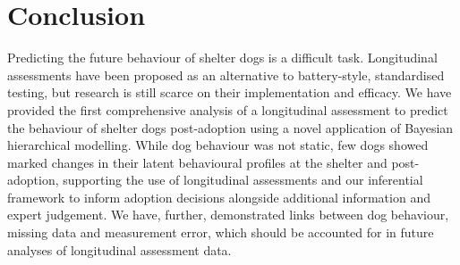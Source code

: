 \documentclass[12pt]{article}
\begin{document}
\section{Conclusion}
Predicting the future behaviour of shelter dogs is a difficult task. Longitudinal assessments have been proposed as an alternative to battery-style, standardised testing, but research is still scarce on their implementation and efficacy. We have provided the first comprehensive analysis of a longitudinal assessment to predict the behaviour of shelter dogs post-adoption using a novel application of Bayesian hierarchical modelling. While dog behaviour was not static, few dogs showed marked changes in their latent behavioural profiles at the shelter and post-adoption, supporting the use of longitudinal assessments and our inferential framework to inform adoption decisions alongside additional information and expert judgement. We have, further, demonstrated links between dog behaviour, missing data and measurement error, which should be accounted for in future analyses of longitudinal assessment data.


\newpage
\printbibliography
\end{document}
